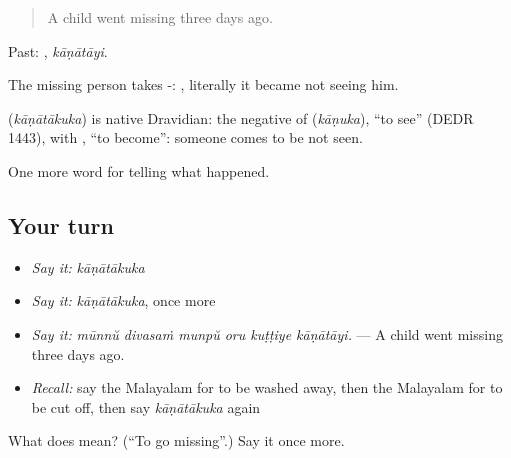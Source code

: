 \begin{quote}
A child went missing three days ago.
\end{quote}

Past: , \emph{kāṇātāyi}.

The missing person takes -:  , literally it became not seeing him.

\begin{cousinweb}
\textbf{} (\emph{kāṇātākuka}) is native Dravidian: the negative of  (\emph{kāṇuka}), \textquotedblleft{}to see\textquotedblright{} (DEDR 1443), with , \textquotedblleft{}to become\textquotedblright{}: someone comes to be not seen.
\end{cousinweb}

\begin{grammarlens}[title={What you've built}]
One more word for telling what happened.
\end{grammarlens}

\subsection*{Your turn}
\begin{itemize}
\raggedright
  \item \emph{Say it:} \emph{kāṇātākuka}
  \item \emph{Say it:} \emph{kāṇātākuka}, once more
  \item \emph{Say it:} \emph{mūnnŭ divasaṁ munpŭ oru kuṭṭiye kāṇātāyi.} — A child went missing three days ago.
  \item \emph{Recall:} say the Malayalam for to be washed away, then the Malayalam for to be cut off, then say \emph{kāṇātākuka} again
\end{itemize}

\begin{tcolorbox}[breakable,colback=teal!4,colframe=teal!35!black,title={Before you move on}]
What does  mean? (\textquotedblleft{}To go missing\textquotedblright{}.) Say it once more.
\end{tcolorbox}
